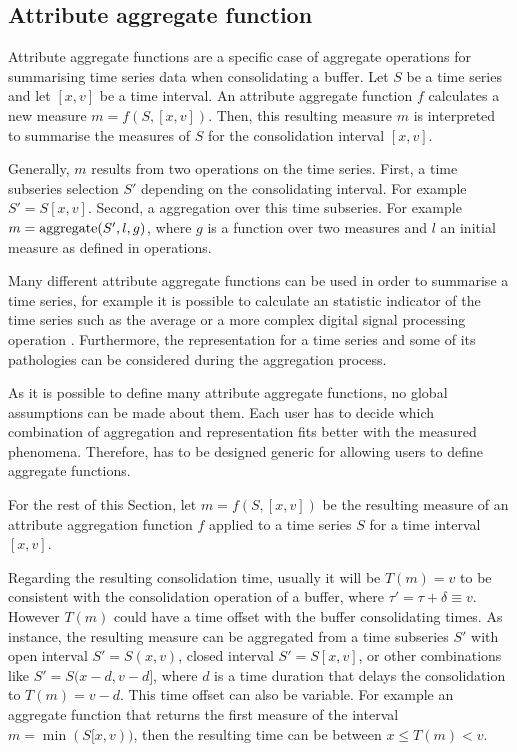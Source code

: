 \subsection{Attribute aggregate function}
\label{sec:model:interpolador}

Attribute aggregate functions are a specific case of 
aggregate operations for summarising time series data when
consolidating a buffer. Let $S$ be a time series and let $[x,v]$ be a
time interval. An attribute aggregate function $f$ calculates a new
measure $m=f(S,[x,v])$. Then, this resulting measure $m$ is interpreted to
summarise the measures of $S$ for the consolidation interval $[x,v]$.



Generally, $m$ results from two operations on the time series.  First,
a time subseries selection $S'$ depending on the consolidating
interval. For example $S' = S[x,v]$. Second, a  aggregation
over this time subseries. For example $m = \operatorname*{aggregate}(S',l, g)$, where $g$
is a function over two measures and $l$ an initial measure as defined
in  operations.


Many different attribute aggregate functions can be used in order to
summarise a time series, for example it is possible to calculate an
statistic indicator of the time series such as the average or a more
complex digital signal processing operation
\cite{zhang11}. Furthermore, the representation for a time series and
some of its pathologies can be considered during the aggregation
process.


As it is possible to define many attribute aggregate
functions, no global assumptions can be made about them. Each user has
to decide which combination of aggregation and representation fits
better with the measured phenomena.  Therefore,  has to be
designed generic for allowing users to define aggregate functions.


For the rest of this Section, let $m=f(S,[x,v])$ be the resulting
measure of an attribute aggregation function $f$ applied to a time
series $S$ for a time interval $[x,v]$.

Regarding the resulting consolidation time, usually it will be
$T(m)=v$ to be consistent with the consolidation operation of a
buffer, where $\tau' = \tau + \delta \equiv v$. However $T(m)$ could
have a time offset with the buffer consolidating times. As instance,
the resulting measure can be aggregated from a time subseries $S'$
with open interval $S'=S(x,v)$, closed interval $S'=S[x,v]$, or other
combinations like $S'=S(x-d,v-d]$, where $d$ is a time duration that
delays the consolidation to $T(m)=v-d$.  This time offset can also be
variable. For example an aggregate function that returns the first
measure of the interval $m=\min(S[x,v))$, then the resulting
time can be between $x \leq T(m) < v$.


